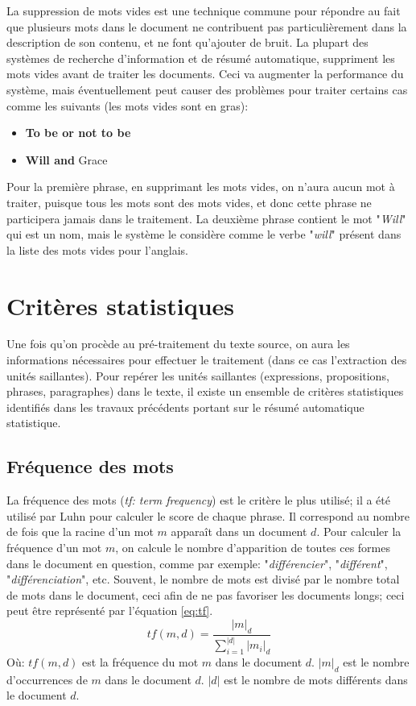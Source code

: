 \documentclass[a4paper,12pt,oneside]{../use/ESIthesis}
\begin{document}
La suppression de mots vides est une technique commune pour répondre au fait que plusieurs mots dans le document ne contribuent pas particulièrement dans la description de son contenu, et ne font qu'ajouter de bruit. 
La plupart des systèmes de recherche d'information et de résumé automatique, suppriment les mots vides avant de traiter les documents. 
Ceci va augmenter la performance du système, mais éventuellement peut causer des problèmes pour traiter certains cas comme les suivants (les mots vides sont en gras):
\begin{itemize}
\item \textbf{To be or not to be}
\item \textbf{Will and} Grace
\end{itemize}
Pour la première phrase, en supprimant les mots vides, on n'aura aucun mot à traiter, puisque tous les mots sont des mots vides, et donc cette phrase ne participera jamais dans le traitement. 
La deuxième phrase contient le mot "\textit{Will}" qui est un nom, mais le système le considère comme le verbe "\textit{will}" présent dans la liste des mots vides pour l'anglais. 

\section{Critères statistiques}
\label{sec:crit-stat}

Une fois qu'on procède au pré-traitement du texte source, on aura les informations nécessaires pour effectuer le traitement (dans ce cas l'extraction des unités saillantes). 
Pour repérer les unités saillantes (expressions, propositions, phrases, paragraphes) dans le texte, il existe un ensemble de critères statistiques identifiés dans les travaux précédents portant sur le résumé automatique statistique. 

\subsection{Fréquence des mots}

La fréquence des mots (\textit{tf: term frequency}) est le critère le plus utilisé; il a été utilisé par Luhn \cite{58-luhn} pour calculer le score de chaque phrase. 
Il correspond au nombre de fois que la racine d'un mot $ m $ apparaît dans un document $ d $. 
Pour calculer la fréquence d'un mot $ m $, on calcule le nombre d'apparition de toutes ces formes dans le document en question, comme par exemple: "\textit{différencier}", "\textit{différent}", "\textit{différenciation}", etc.
Souvent, le nombre de mots est divisé par le nombre total de mots dans le document, ceci afin de ne pas favoriser les documents longs; ceci peut être représenté par l'équation \ref{eq:tf}.
%
\begin{equation}
\label{eq:tf}
tf(m, d) = \frac{|m|_d}{\sum_{i = 1}^{|d|}{|m_i|_d}}
\end{equation}
Où: 
$ tf(m, d) $ est la fréquence du mot $ m $ dans le document $ d $. 
$ |m|_d $ est le nombre d'occurrences de $ m $ dans le document $ d $. 
$ |d| $ est le nombre de mots différents dans le document $ d $. 
\end{document}
